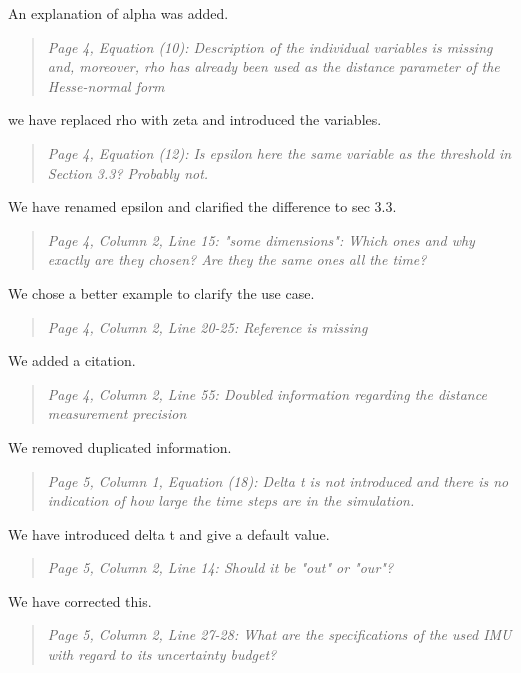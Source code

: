 \documentclass{article}
\newenvironment{itquote}
  {\begin{quote}\itshape}
  {\end{quote}\ignorespacesafterend}
\begin{document}
An explanation of alpha was added.

\begin{itquote}
Page 4, Equation (10): Description of the individual variables is
missing and, moreover, rho has already been used as the distance
parameter of the Hesse-normal form
\end{itquote}

we have replaced rho with zeta and introduced the variables.

\begin{itquote}
Page 4, Equation (12): Is epsilon here the same variable as the
threshold in Section 3.3? Probably not.
\end{itquote}

We have renamed epsilon and clarified the difference to sec 3.3.

\begin{itquote}
Page 4, Column 2, Line 15: "some dimensions": Which ones and why
exactly are they chosen? Are they the same ones all the time?
\end{itquote}

We chose a better example to clarify the use case.

\begin{itquote}
Page 4, Column 2, Line 20-25: Reference is missing
\end{itquote}
We added a citation.

\begin{itquote}
Page 4, Column 2, Line 55: Doubled information regarding the
distance measurement precision 
\end{itquote}

We removed duplicated information.

\begin{itquote}
Page 5, Column 1, Equation (18): Delta t is not introduced and there
is no indication of how large the time steps are in the simulation.
\end{itquote}

We have introduced delta t and give a default value.

\begin{itquote}
Page 5, Column 2, Line 14: Should it be "out" or "our"?
\end{itquote}

We have corrected this.

\begin{itquote}
Page 5, Column 2, Line 27-28: What are the specifications of the
used IMU with regard to its uncertainty budget?
\end{itquote}
\end{document}

